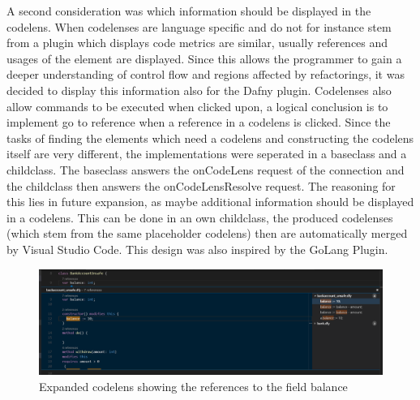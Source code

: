 A second consideration was which information should be displayed in the codelens. When codelenses are language specific and do not for instance stem from a plugin which displays code metrics are similar, usually references and usages of the element are displayed. Since this allows the programmer to gain a deeper understanding of control flow and regions affected by refactorings, it was decided to display this information also for the Dafny plugin. Codelenses also allow commands to be executed when clicked upon, a logical conclusion is to implement go to reference when a reference in a codelens is clicked.\newline
Since the tasks of finding the elements which need a codelens and constructing the codelens itself are very different, the implementations were seperated in a baseclass and a childclass. The baseclass answers the onCodeLens request of the connection and the childclass then answers the onCodeLensResolve request. The reasoning for this lies in future expansion, as maybe additional information should be displayed in a codelens. This can be done in an own childclass, the produced codelenses (which stem from the same placeholder codelens) then are automatically merged by Visual Studio Code. This design was also inspired by the GoLang Plugin. 

\begin{figure}[H]
	\centering
	\includegraphics[width=1\textwidth]{img/codelensesExpanded}
	\caption{Expanded codelens showing the references to the field balance}
	\label{fig:codelensesexpanded}
\end{figure}

